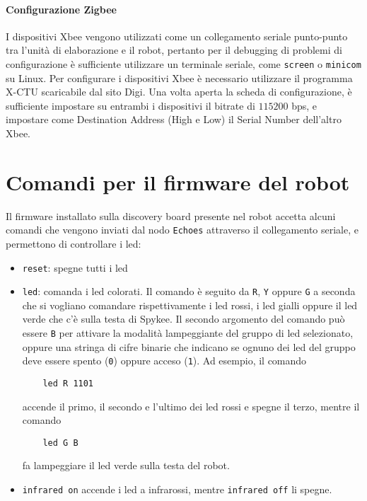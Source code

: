 \paragraph{Configurazione Zigbee} I dispositivi Xbee vengono utilizzati come un collegamento seriale punto-punto tra l'unità di elaborazione e il robot, pertanto per il debugging di problemi di configurazione è sufficiente utilizzare un terminale seriale, come \verb|screen| o \verb|minicom| su Linux. Per configurare i dispositivi Xbee è necessario utilizzare il programma X-CTU scaricabile dal sito Digi. Una volta aperta la scheda di configurazione, è sufficiente impostare su entrambi i dispositivi il bitrate di $115200$ bps, e impostare come Destination Address (High e Low) il Serial Number dell'altro Xbee.

\section{Comandi per il firmware del robot}
Il firmware installato sulla discovery board presente nel robot accetta alcuni comandi che vengono inviati dal nodo \verb|Echoes| attraverso il collegamento seriale, e permettono di controllare i led:
\begin{itemize}
\item \verb|reset|: spegne tutti i led
\item \verb|led|: comanda i led colorati. Il comando è seguito da \verb|R|, \verb|Y| oppure \verb|G| a seconda che si vogliano comandare rispettivamente i led rossi, i led gialli oppure il led verde che c'è sulla testa di Spykee. Il secondo argomento del comando può essere \verb|B| per attivare la modalità lampeggiante del gruppo di led selezionato, oppure una stringa di cifre binarie che indicano se ognuno dei led del gruppo deve essere spento (\verb|0|) oppure acceso (\verb|1|). Ad esempio, il comando
\begin{verbatim}
    led R 1101
\end{verbatim}
accende il primo, il secondo e l'ultimo dei led rossi e spegne il terzo, mentre il comando
\begin{verbatim}
    led G B
\end{verbatim}
fa lampeggiare il led verde sulla testa del robot.
\item \verb|infrared on| accende i led a infrarossi, mentre \verb|infrared off| li spegne.
\end{itemize}

